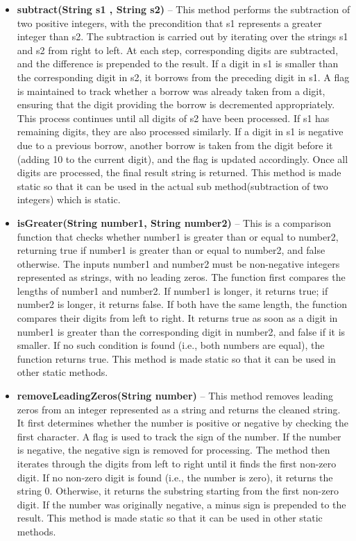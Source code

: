 \documentclass[a4paper,12pt]{article}
\begin{document}
\begin{itemize}
    \item \textbf{subtract(String s1 , String s2)} -- This method performs the subtraction of two positive integers, with the precondition that s1 represents a greater integer than s2. The subtraction is carried out by iterating over the strings s1 and s2 from right to left. At each step, corresponding digits are subtracted, and the difference is prepended to the result. If a digit in s1 is smaller than the corresponding digit in s2, it borrows from the preceding digit in s1. A flag is maintained to track whether a borrow was already taken from a digit, ensuring that the digit providing the borrow is decremented appropriately. This process continues until all digits of s2 have been processed. If s1 has remaining digits, they are also processed similarly. If a digit in s1 is negative due to a previous borrow, another borrow is taken from the digit before it (adding 10 to the current digit), and the flag is updated accordingly. Once all digits are processed, the final result string is returned. This method is made static so that it can be used in the actual sub method(subtraction of two integers) which is static.\\

    \item \textbf{isGreater(String number1, String number2)} -- This is a comparison function that checks whether number1 is greater than or equal to number2, returning true if number1 is greater than or equal to number2, and false otherwise. The inputs number1 and number2 must be non-negative integers represented as strings, with no leading zeros. The function first compares the lengths of number1 and number2. If number1 is longer, it returns true; if number2 is longer, it returns false. If both have the same length, the function compares their digits from left to right. It returns true as soon as a digit in number1 is greater than the corresponding digit in number2, and false if it is smaller. If no such condition is found (i.e., both numbers are equal), the function returns true. This method is made static so that it can be used in other static methods.\\

    \item \textbf{removeLeadingZeros(String number)} -- This method removes leading zeros from an integer represented as a string and returns the cleaned string. It first determines whether the number is positive or negative by checking the first character. A flag is used to track the sign of the number. If the number is negative, the negative sign is removed for processing. The method then iterates through the digits from left to right until it finds the first non-zero digit. If no non-zero digit is found (i.e., the number is zero), it returns the string $0$. Otherwise, it returns the substring starting from the first non-zero digit. If the number was originally negative, a minus sign is prepended to the result. This method is made static so that it can be used in other static methods.\\


\end{itemize}
\end{document}
